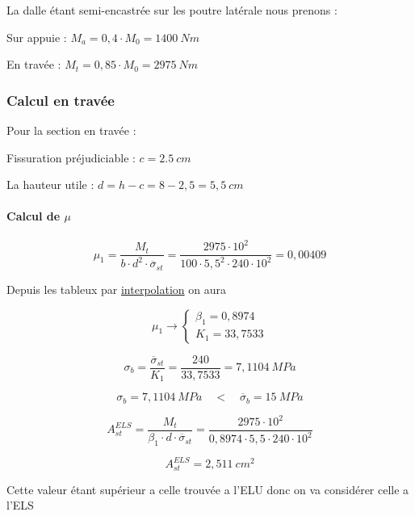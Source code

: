 \documentclass[12pt,a4paper]{article}
\begin{document}
	
	
	La dalle étant semi-encastrée sur les poutre latérale nous prenons :
	
	Sur appuie : $M_{a} = 0,4 \cdot M_{0} = 1400 ~\unit{Nm}$
	
	En travée : $M_{t} = 0,85 \cdot M_{0} = 2975 ~\unit{Nm}$
	
	\subsubsection{Calcul en travée}
	
	Pour la section en travée :
	
	Fissuration préjudiciable : $c = 2.5 ~\unit{cm}$
	
	
	\vspace{\baselineskip}
	
	La hauteur utile : $d = h - c = 8 - 2,5 = 5,5 ~\unit{cm}$
	
	
	\paragraph{Calcul de $\mu$}
	
	\[ \mu_{1} = \dfrac{M_{t}}{b \cdot d^{2} \cdot \overline{\sigma}_{st}} = \dfrac{2975 \cdot 10^{2}}{100 \cdot 5,5^{2} \cdot 240 \cdot 10^{2}} = 0,00409 \]
	
	Depuis les tableux par \underline{interpolation} on aura 
	
	\[ \mu_{1} \rightarrow \begin{cases}
		\beta_{1} = 0,8974 \\
		K_{1} = 33,7533
	\end{cases} \]
	
	
	\[ \sigma_{b} = \dfrac{\overline{\sigma}_{st}}{K_{1}} = \dfrac{240}{33,7533} = 7,1104 ~\unit{MPa} \]
	
	
	\[ \sigma_{b}  = 7,1104 ~\unit{MPa} \quad < \quad \overline{\sigma}_{b} = 15 ~\unit{MPa} \]
	
	\vspace{\baselineskip}
	
	
	\[ A_{st}^{ELS} = \dfrac{M_{t}}{\beta_{1} \cdot d \cdot \overline{\sigma}_{st}} = \dfrac{2975 \cdot 10^{2}}{0,8974 \cdot 5,5 \cdot 240 \cdot 10^{2}} \]
	
	\[ A_{st}^{ELS} = 2,511 ~\unit{cm^{2}} \]
	
	
	\begin{tcolorbox}[colback=gray!20, colframe=black, title=Remarque]
		Cette valeur étant supérieur a celle trouvée a l'ELU donc on va considérer celle a l'ELS
	\end{tcolorbox}
	
\end{document}
